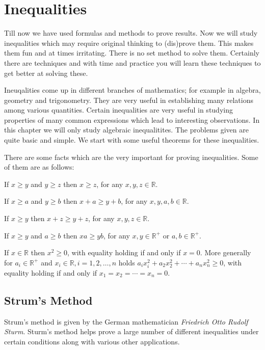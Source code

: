 \chapter{Inequalities}
Till now we have used formulas and methods to prove results. Now we will study inequalities which may
require original thinking to (dis)prove them. This makes them fun and at times irritating. There is no
set method to solve them. Certainly there are techniques and with time and practice you will learn these
techniques to get better at solving these.

Ineuqalities come up in different branches of mathematics; for example in algebra, geometry and trigonometry. They are very
useful in establishing many relations among various quantities. Certain inequalities are very useful in studying properties of
many common expressions which lead to interesting observations. In this chapter we will only study algebraic inequalitites. The
problems given are quite basic and simple. We start with some useful theorems for these inequalities.

There are some facts which are the very important for proving inequalities. Some of them are as follows:

\startitemize[n]
\item If $x\geq y$ and $y\geq z$ then $x\geq z$, for any $x, y, z\in\mathbb{R}$.
\item If $x\geq a$ and $y\geq b$ then $x + a\geq y + b$, for any $x, y, a, b\in\mathbb{R}$.
\item If $x\geq y$ then $x + z\geq y + z$, for any $x, y, z\in\mathbb{R}$.
\item If $x\geq y$ and $a\geq b$ then $xa\geq yb$, for any $x, y\in\mathbb{R}^+$ or $a, b\in\mathbb{R}^+$.
\item If $x\in\mathbb{R}$ then $x^2\geq 0$, with equality holding if and only if $x = 0$. More generally for $a_i\in\mathbb{R}^+$
  and $x_i\in\mathbb{R}, i = 1, 2, \ldots, n$ holds $a_ix_i^2 + a_2x_2^2 + \cdots + a_nx_n^2\geq 0$, with equality holding if and
  only if $x_1 = x_2 = \cdots = x_n = 0$.
\stopitemize

\section{Strum's Method}
Strum's method is given by the German mathematician {\sl Friedrich Otto Rudolf Sturm}. Sturm's method helps prove a large number of
different inequalities under certain conditions along with various other applications.

